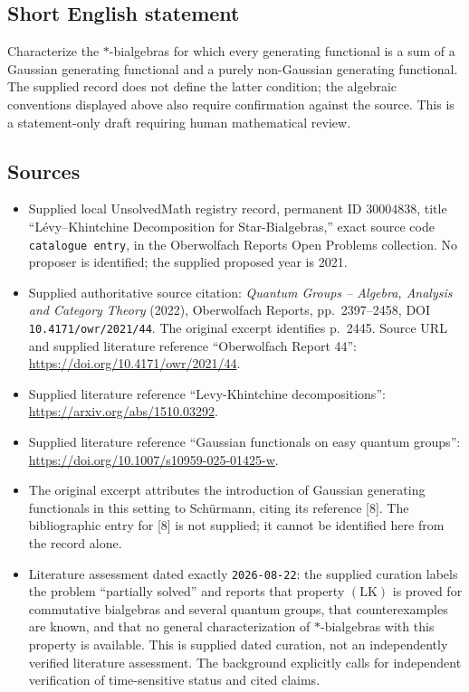 \documentclass[11pt]{article}
\begin{document}
\subsection{Short English statement}
Characterize the \(*\)-bialgebras for which every generating functional is a sum of a Gaussian generating functional and a purely non-Gaussian generating functional. The supplied record does not define the latter condition; the algebraic conventions displayed above also require confirmation against the source. This is a statement-only draft requiring human mathematical review.
\subsection{Sources}
\begin{itemize}
\item Supplied local UnsolvedMath registry record, permanent ID \(30004838\), title ``L\'evy--Khintchine Decomposition for Star-Bialgebras,'' exact source code \texttt{catalogue entry}, in the Oberwolfach Reports Open Problems collection. No proposer is identified; the supplied proposed year is 2021.
\item Supplied authoritative source citation: \emph{Quantum Groups -- Algebra, Analysis and Category Theory} (2022), Oberwolfach Reports, pp.~2397--2458, DOI \texttt{10.4171/owr/2021/44}. The original excerpt identifies p.~2445. Source URL and supplied literature reference ``Oberwolfach Report 44'': \url{https://doi.org/10.4171/owr/2021/44}.
\item Supplied literature reference ``Levy-Khintchine decompositions'': \url{https://arxiv.org/abs/1510.03292}.
\item Supplied literature reference ``Gaussian functionals on easy quantum groups'': \url{https://doi.org/10.1007/s10959-025-01425-w}.
\item The original excerpt attributes the introduction of Gaussian generating functionals in this setting to Sch\"urmann, citing its reference [8]. The bibliographic entry for [8] is not supplied; it cannot be identified here from the record alone.
\item Literature assessment dated exactly \texttt{2026-08-22}: the supplied curation labels the problem ``partially solved'' and reports that property \((\mathrm{LK})\) is proved for commutative bialgebras and several quantum groups, that counterexamples are known, and that no general characterization of \(*\)-bialgebras with this property is available. This is supplied dated curation, not an independently verified literature assessment. The background explicitly calls for independent verification of time-sensitive status and cited claims.
\end{itemize}
\end{document}
